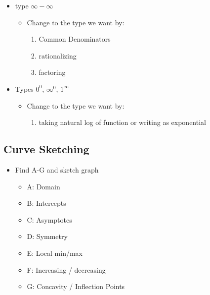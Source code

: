 \documentclass{report}
\begin{document}
    \begin{itemize}
      \item type $\infty-\infty$
        \begin{itemize}
          \item Change to the type we want by:
            \begin{enumerate}
              \item Common Denominators
              \item rationalizing
              \item factoring
            \end{enumerate}
        \end{itemize}
    \end{itemize}
    \begin{itemize}
      \item Types $0^{0}$, $\infty^{0}$, $1^{\infty} $
        \begin{itemize}
          \item Change to the type we want by:
            \begin{enumerate}
              \item taking natural log of function or writing as exponential
            \end{enumerate}
        \end{itemize}
    \end{itemize}

    \bigbreak \noindent \bigbreak \noindent 


    \pagebreak \bigbreak \noindent
    \subsection{Curve Sketching}
    \begin{itemize}
      \item Find A-G and sketch graph
        \begin{itemize}
          \item A: Domain
          \item B: Intercepts
          \item C: Asymptotes
          \item D: Symmetry
          \item E: Local min/max
          \item F: Increasing / decreasing
          \item G: Concavity / Inflection Points
        \end{itemize}
    \end{itemize}
\end{document}
